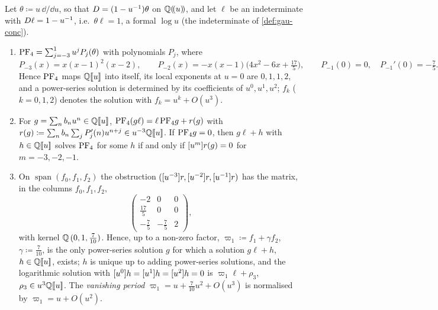 \begin{lem}
\label{lem:set-frobbasis}
Let $\theta\coloneqq u\,\dd/\dd u$, so that $D=(1-u^{-1})\theta$ on $\mathbb{Q}(\!(u)\!)$, and let $\ell$ be an indeterminate with $D\ell=1-u^{-1}$, i.e.\ $\theta\ell=1$, a formal $\log u$ (the indeterminate of \cref{def:gau-conc}).
\begin{enumerate}
\item $\mathrm{PF}_{4}=\sum_{j=-3}^{1}u^jP_j(\theta)$ with polynomials $P_j$, where
\[
P_{-3}(x)=x(x-1)^2(x-2),\qquad P_{-2}(x)=-x(x-1)\bigl(4x^2-6x+\tfrac{17}5\bigr),\qquad P_{-1}(0)=0,\quad P_{-1}'(0)=-\tfrac75 .
\]
Hence $\mathrm{PF}_{4}$ maps $\mathbb{Q}[\![ u ]\!]$ into itself, its local exponents at $u=0$ are $0,1,1,2$, and a power-series solution is determined by its coefficients of $u^0,u^1,u^2$; $f_k$ ($k=0,1,2$) denotes the solution with $f_k=u^k+O(u^3)$.
\item For $g=\sum_nb_nu^n\in\mathbb{Q}[\![ u ]\!]$, $\mathrm{PF}_{4}(g\ell)=\ell\,\mathrm{PF}_{4} g+r(g)$ with $r(g)\coloneqq\sum_nb_n\sum_jP_j'(n)u^{n+j}\in u^{-3}\mathbb{Q}[\![ u ]\!]$. If $\mathrm{PF}_{4} g=0$, then $g\ell+h$ with $h\in\mathbb{Q}[\![ u ]\!]$ solves $\mathrm{PF}_{4}$ for some $h$ if and only if $[u^m]r(g)=0$ for $m=-3,-2,-1$.
\item On $\operatorname{span}(f_0,f_1,f_2)$ the obstruction $([u^{-3}]r,[u^{-2}]r,[u^{-1}]r)$ has the matrix, in the columns $f_0,f_1,f_2$,
\[
\begin{pmatrix}-2&0&0\\ \frac{17}5&0&0\\ -\frac75&-\frac75&2\end{pmatrix},
\]
with kernel $\mathbb{Q}\,(0,1,\frac7{10})$. Hence, up to a non-zero factor, $\varpi_1\coloneqq f_1+\gamma f_2$, $\gamma\coloneqq\frac7{10}$, is the only power-series solution $g$ for which a solution $g\ell+h$, $h\in\mathbb{Q}[\![ u ]\!]$, exists; $h$ is unique up to adding power-series solutions, and the logarithmic solution with $[u^0]h=[u^1]h=[u^2]h=0$ is $\varpi_1\ell+\rho_3$, $\rho_3\in u^3\mathbb{Q}[\![ u ]\!]$. The \emph{vanishing period} $\varpi_1=u+\frac7{10}u^2+O(u^3)$ is normalised by $\varpi_1=u+O(u^2)$.
\end{enumerate}
\end{lem}

